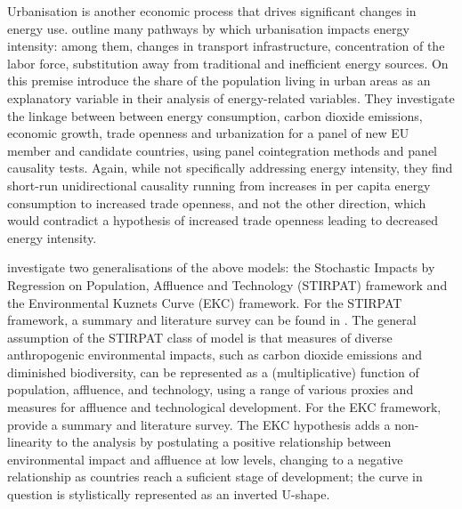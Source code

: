 \documentclass[12pt,a4paper]{article}
\begin{document}
Urbanisation is another economic process that drives significant changes in energy use.  
\cite{madlenerImpactsUrbanizationUrban2011} outline many pathways by which urbanisation impacts energy intensity: among them, changes in transport infrastructure, concentration of the labor force, substitution away from traditional and inefficient energy sources.
On this premise \cite{kasmanCO2EmissionsEconomic2015} introduce the share of the population living in urban areas as an explanatory variable in their analysis of energy-related variables.
They investigate the linkage between between energy consumption, carbon dioxide emissions, economic growth, trade openness and urbanization for a panel of new EU member and candidate countries, using panel cointegration methods and panel causality tests.
Again, while not specifically addressing energy intensity, they find short-run unidirectional
causality running from increases in per capita energy consumption to increased trade openness, and not the other direction, which would contradict a hypothesis of increased trade openness leading to decreased energy intensity.

\cite{rafiqUrbanizationOpennessEmissions2016} investigate two generalisations of the above models: the Stochastic Impacts by Regression on Population, Affluence and Technology (STIRPAT) framework and the Environmental Kuznets Curve (EKC) framework.
For the STIRPAT framework, a summary and literature survey can be found in \cite{mcgeeImpactsTechnologyReevaluation2015}.
The general assumption of the STIRPAT class of model is that measures of diverse anthropogenic environmental impacts, such as carbon dioxide emissions and diminished biodiversity, can be represented as a (multiplicative) function of population, affluence, and technology, using a range of various proxies and measures for affluence and technological development.
For the EKC framework, \cite{dindaEnvironmentalKuznetsCurve2004} provide a summary and literature survey. 
The EKC hypothesis adds a non-linearity to the analysis by postulating a positive relationship between environmental impact and affluence at low levels, changing to a negative relationship as countries reach a suficient stage of development; the curve in question is stylistically represented as an inverted U-shape.
\end{document}
